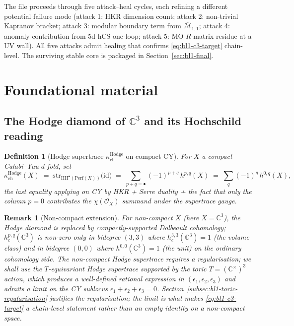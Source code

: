 \documentclass[11pt]{article}
\newtheorem{definition}[theorem]{Definition}
\newtheorem{remark}[theorem]{Remark}
\providecommand{\HH}{\mathrm{HH}}
\providecommand{\Perf}{\mathrm{Perf}}
\providecommand{\id}{\mathrm{id}}
\providecommand{\cO}{\mathcal{O}}
\providecommand{\C}{\mathbb{C}}
\providecommand{\kch}{\kappa_{\mathrm{ch}}}
\providecommand{\Mbar}{\overline{\mathcal M}}
\providecommand{\str}{\mathrm{str}}
\providecommand{\id}{\mathrm{id}}
\begin{document}
The file proceeds through five attack--heal cycles, each refining a
different potential failure mode (attack 1: HKR dimension count; attack
2: non-trivial Kapranov bracket; attack 3: modular boundary term from
$\Mbar_{1,1}$; attack 4: anomaly contribution from 5d hCS one-loop;
attack 5: MO $R$-matrix residue at a UV wall). All five attacks admit
healing that confirms \eqref{eq:bl1-c3-target} chain-level. The surviving
stable core is packaged in Section~\ref{sec:bl1-final}.

\tableofcontents

\section{Foundational material}
\label{sec:bl1-foundations}

\subsection{The Hodge diamond of $\C^3$ and its Hochschild reading}
\label{subsec:bl1-hodge-c3}

\begin{definition}[Hodge supertrace $\kch^{\mathrm{Hodge}}$ on compact CY]
\label{def:bl1-kch-hodge-compact}
For $X$ a compact Calabi--Yau $d$-fold, set
\begin{equation}
\label{eq:bl1-kch-hodge-compact}
  \kch^{\mathrm{Hodge}}(X)
  \;=\; \str_{\HH^\bullet(\Perf(X))}\!\bigl( \id \bigr)
  \;=\; \sum_{p+q = \bullet} (-1)^{p+q}\, h^{p,q}(X)
  \;=\; \sum_{q} (-1)^q\, h^{0,q}(X),
\end{equation}
the last equality applying on CY by HKR + Serre
duality + the fact that only the column $p = 0$ contributes the
$\chi(\cO_X)$ summand under the supertrace gauge.
\end{definition}

\begin{remark}[Non-compact extension]
\label{rem:bl1-kch-hodge-noncompact}
For non-compact $X$ (here $X = \C^3$), the Hodge diamond is replaced by
compactly-supported Dolbeault cohomology; $h^{p,q}_c(\C^3)$ is non-zero
only in bidegree $(3,3)$ where $h^{3,3}_c(\C^3) = 1$ (the volume class)
and in bidegree $(0,0)$ where $h^{0,0}(\C^3) = 1$ (the unit) on the
ordinary cohomology side. The non-compact Hodge supertrace requires a
regularisation; we shall use the $T$-equivariant Hodge supertrace
supported by the toric $T = (\C^\times)^3$ action, which produces a
well-defined rational expression in $(\epsilon_1, \epsilon_2, \epsilon_3)$
and admits a limit on the CY sublocus $\epsilon_1 + \epsilon_2 +
\epsilon_3 = 0$. Section~\ref{subsec:bl1-toric-regularisation} justifies
the regularisation; the limit is what makes
\eqref{eq:bl1-c3-target} a \emph{chain-level} statement rather than an
empty identity on a non-compact space.
\end{remark}
\end{document}
